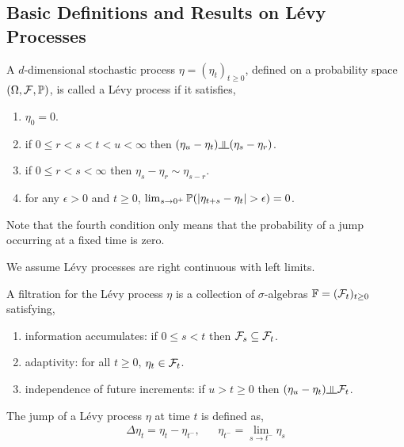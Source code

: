 \documentclass[12pt]{article}
\begin{document}
\subsection{Basic Definitions and Results on L\'evy Processes}

\begin{definition}
    A \( d \)-dimensional stochastic process \( \eta = (\eta_t)_{t\geq 0} \), defined on a probability space \( (\Omega,\mathcal{F},\mathbb{P}) \), is called a L\'evy process if it satisfies,
\begin{enumerate}[nolistsep]
    \item \( \eta_0 = 0 \).
    \item if \( 0\leq r < s<t<u<\infty \) then \( (\eta_u-\eta_t) \indep (\eta_s-\eta_r) \). 
    \item if \( 0\leq r < s< \infty \) then \( \eta_s-\eta_r \sim \eta_{s-r} \).
    \item for any \( \epsilon > 0 \) and \( t \geq 0 \), \( \lim_{s\to 0^+} \mathbb{P}(|\eta_{t+s} -\eta_t| > \epsilon) = 0 \).
\end{enumerate}
\end{definition}

Note that the fourth condition only means that the probability of a jump occurring at a fixed time is zero.

We assume L\'evy processes are right continuous with left limits.

\begin{definition}
A filtration for the L\'evy process \( \eta \) is a collection of \( \sigma \)-algebras \( \mathbb{F} = (\mathcal{F}_t)_{t\geq 0} \) satisfying,
\begin{enumerate}
    \item information accumulates: if \( 0\leq s < t \) then \( \mathcal{F}_s \subseteq \mathcal{F}_t \).
    \item adaptivity: for all \( t\geq 0 \), \( \eta_t \in \mathcal{F}_t \).
    \item independence of future increments: if \( u > t \geq 0 \) then \( (\eta_u-\eta_t) \indep \cF_t \).
\end{enumerate}    
\end{definition}

\begin{definition}
The jump of a L\'evy process \( \eta \) at time \( t \) is defined as,
\begin{align*}
    \Delta \eta_t = \eta_t - \eta_{t^-}, && \eta_{t^-} = \lim_{s\to t^{-}} \eta_s
\end{align*}
\end{definition}
\end{document}
